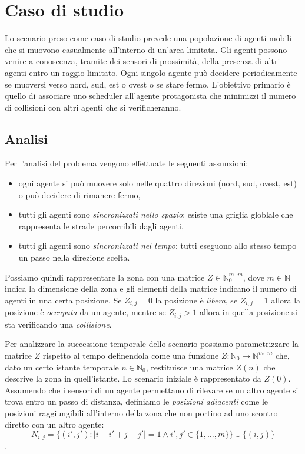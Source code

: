 
\chapter{Caso di studio}


Lo scenario preso come caso di studio prevede una popolazione di agenti mobili che si muovono casualmente all'interno di un'area limitata. Gli agenti possono venire a conoscenza, tramite dei sensori di prossimità, della presenza di altri agenti entro un raggio limitato.
Ogni singolo agente può decidere periodicamente se muoversi verso nord, sud, est o ovest o se stare fermo.
L’obiettivo primario è quello di associare uno scheduler all'agente protagonista che minimizzi il numero di collisioni con altri agenti che si verificheranno.

\section{Analisi}
Per l’analisi del problema vengono effettuate le seguenti assunzioni:
\begin{itemize}
	\item ogni agente si può muovere solo nelle quattro direzioni (nord, sud, ovest, est) o può decidere di rimanere fermo,
	\item tutti gli agenti sono \emph{sincronizzati nello spazio}: esiste una griglia globlale che rappresenta le strade percorribili dagli agenti,
	\item tutti gli agenti sono \emph{sincronizzati nel tempo}: tutti eseguono allo stesso tempo un passo nella direzione scelta.
\end{itemize}

Possiamo quindi rappresentare la zona con una matrice $Z \in \mathbb{N}_0^{m\cdot m}$, dove $m \in \mathbb{N}$ indica la dimensione della zona e gli elementi della matrice indicano il numero di agenti in una certa posizione. Se $Z_{i,j}=0$ la posizione è \emph{libera}, se $Z_{i,j}=1$  allora la posizione è \emph{occupata} da un agente, mentre se $Z_{i,j}>1$ allora in quella posizione si sta verificando una \emph{collisione}.

Per analizzare la successione temporale dello scenario possiamo parametrizzare la matrice $Z$ rispetto al tempo definendola come una funzione $Z:\mathbb{N}_0 \rightarrow \mathbb{N}^{m\cdot m}$ che, dato un certo istante temporale $n \in \mathbb{N}_0$, restituisce una matrice $Z(n)$ che descrive la zona in quell’istante. Lo scenario iniziale è rappresentato da $Z(0)$.
Assumendo che i sensori di un agente permettano di rilevare se un altro agente si trova entro un passo di distanza, definiamo le \emph{posizioni adiacenti} come le posizioni raggiungibili all’interno della zona che non portino ad uno scontro diretto con un altro agente:
$$ N_{i,j} = \{(i',j') : |i-i'+j-j'| = 1 \wedge i',j' \in \{1,\dots,m\}\} \cup \{(i,j)\} $$.

